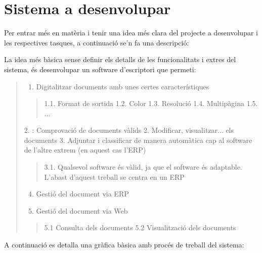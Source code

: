 \documentclass[letterpaper,11pt,catalan]{sphinxmanual}
\begin{document}
\section{Sistema a desenvolupar}
\label{\detokenize{index:sistema-a-desenvolupar}}
Per entrar més en matèria i tenir una idea més clara del projecte a desenvolupar i les respectives
tasques, a continuació se'n fa una descripció:

La idea més bàsica sense definir els detalls de les funcionalitats i extres del sistema, és desenvolupar
un software d'escriptori que permeti:
\begin{quote}
\begin{enumerate}
\item {} 
Digitalitzar documents amb unes certes característiques

\end{enumerate}
\begin{quote}

1.1. Format de sortida
1.2. Color
1.3. Resolució
1.4. Multipàgina
1.5. ...
\end{quote}

2. : Comprovació de documents vàlids
2. Modificar, visualitzar... els documents
3. Adjuntar i classificar de manera automàtica cap al software de l'altre extrem (en aquest cas l'ERP)
\begin{quote}

3.1. Qualsevol software és vàlid, ja que el software és adaptable. L'abast
d'aquest treball se centra en un ERP
\end{quote}
\begin{enumerate}
\setcounter{enumi}{3}
\item {} 
Gestió del document via ERP

\item {} 
Gestió del document via Web

\end{enumerate}
\begin{quote}

5.1 Consulta dels documents
5.2 Visualització dels documents
\end{quote}
\end{quote}

A continuació es detalla una gràfica bàsica amb procés de treball del sistema:

\end{document}
